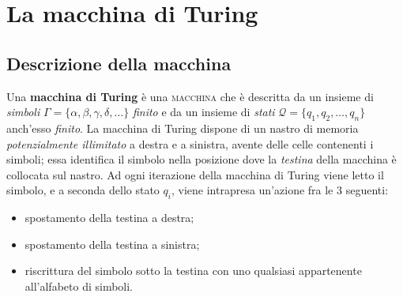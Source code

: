 \documentclass[10pt]{\classname}
\begin{document}
%


\chapter{La macchina di Turing}
\section{Descrizione della macchina}

Una \textbf{macchina di Turing} è una \textsc{macchina} che è descritta da un insieme di
\emph{simboli} $\Gamma = \{\alpha, \beta, \gamma, \delta, \dots\}$ \emph{finito} e da
un insieme di \emph{stati} $\mathcal{Q} = \{q_1, q_2, \dots, q_n\}$ anch'esso
\emph{finito}. La macchina di Turing dispone di un nastro di memoria
\emph{potenzialmente illimitato} a destra e a sinistra, avente delle celle
contenenti i simboli; essa identifica il simbolo nella posizione dove la
\emph{testina} della macchina è collocata sul nastro. Ad ogni iterazione della
macchina di Turing viene letto il simbolo, e a seconda dello stato $q_i$, viene
intrapresa un'azione fra le $3$ seguenti:
\begin{itemize}
    \item spostamento della testina a destra;
    \item spostamento della testina a sinistra;
    \item riscrittura del simbolo sotto la testina con uno qualsiasi
        appartenente all'alfabeto di simboli.
\end{itemize}
\end{document}

